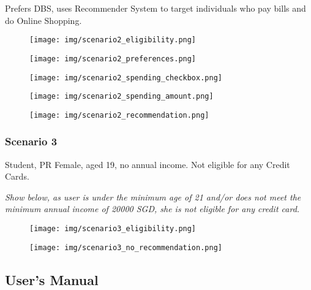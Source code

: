 		Prefers DBS, uses Recommender System to target individuals who pay bills and do Online Shopping.

		\begin{figure}[H]
			\centering
			\texttt{[image: img/scenario2\_eligibility.png]}
		\end{figure}

		\begin{figure}[H]
			\centering
			\texttt{[image: img/scenario2\_preferences.png]}
		\end{figure}

		\begin{figure}[H]
			\centering
			\texttt{[image: img/scenario2\_spending\_checkbox.png]}
		\end{figure}

		\begin{figure}[H]
			\centering
			\texttt{[image: img/scenario2\_spending\_amount.png]}
		\end{figure}

		\begin{figure}[H]
			\centering
			\texttt{[image: img/scenario2\_recommendation.png]}
		\end{figure}

	\subsubsection{Scenario 3} %
	\label{ssub:scenario_3}
		Student, PR Female, aged 19, no annual income. Not eligible for any Credit Cards.

		\textit{Show below, as user is under the minimum age of 21 and/or does not meet the minimum annual income of 20000 SGD, she is not eligible for any credit card.}

		\begin{figure}[H]
			\centering
			\texttt{[image: img/scenario3\_eligibility.png]}
		\end{figure}

		\begin{figure}[H]
			\centering
			\texttt{[image: img/scenario3\_no\_recommendation.png]}
		\end{figure}

\subsection{User's Manual} %
\label{sub:appendix_b}


